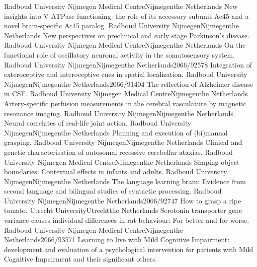	{Radboud University Nijmegen Medical Centre}{Nijmegen}{the Netherlands}{}
	{New insights into V-ATPase functioning: the role of its accessory subunit Ac45 and a novel brain-specific Ac45 paralog.}
	{Radboud University Nijmegen}{Nijmegen}{the Netherlands}{}
	{New perspectives on preclinical and early stage Parkinson's disease.}
	{Radboud University Nijmegen Medical Centre}{Nijmegen}{the Netherlands}{}
	{On the functional role of oscillatory neuronal activity in the somatosensory system.}
	{Radboud University Nijmegen}{Nijmegen}{the Netherlands}{2066/92578}
	{Integration of exteroceptive and interoceptive cues in spatial localization.}
	{Radboud University Nijmegen}{Nijmegen}{the Netherlands}{2066/91404}
	{The reflection of Alzheimer disease in CSF.}
	{Radboud University Nijmegen Medical Centre}{Nijmegen}{the Netherlands}{}
	{Artery-specific perfusion measurements in the cerebral vasculature by magnetic resonance imaging.}
	{Radboud University Nijmegen}{Nijmegen}{the Netherlands}{}
	{Neural correlates of real-life joint action.}
	{Radboud University Nijmegen}{Nijmegen}{the Netherlands}{}
	{Planning and execution of (bi)manual grasping.}
	{Radboud University Nijmegen}{Nijmegen}{the Netherlands}{}
	{Clinical and genetic characterisation of autosomal recessive cerebellar ataxias.}
	{Radboud University Nijmegen Medical Centre}{Nijmegen}{the Netherlands}{}
	{Shaping object boundaries: Contextual effects in infants and adults.}
	{Radboud University Nijmegen}{Nijmegen}{the Netherlands}{}
	{The language learning brain: Evidence from second language and bilingual studies of syntactic processing.}
	{Radboud University Nijmegen}{Nijmegen}{the Netherlands}{2066/92747}
	{How to grasp a ripe tomato.}
	{Utrecht University}{Utrecht}{the Netherlands}{}
	{Serotonin transporter gene variance causes individual differences in rat behaviour: For better and for worse.}
	{Radboud University Nijmegen Medical Centre}{Nijmegen}{the Netherlands}{2066/93571}
	{Learning to live with Mild Cognitive Impairment: development and evaluation of a psychological intervention for patients with Mild Cognitive Impairment and their significant others.}
